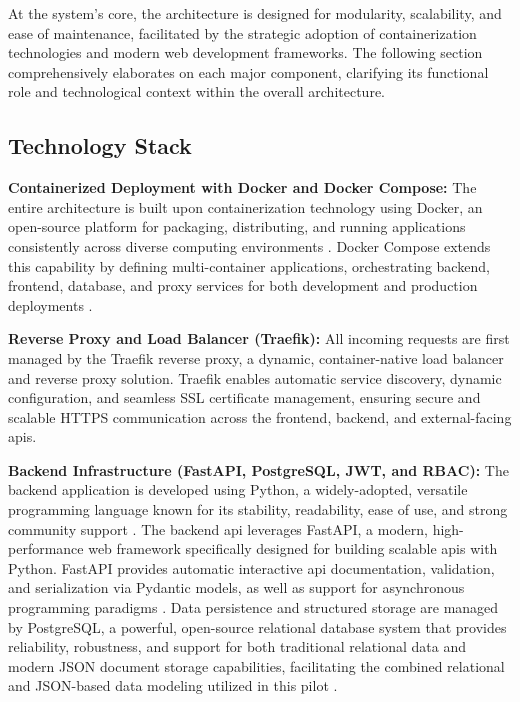 At the system’s core, the architecture is designed for modularity, scalability, and ease of maintenance, facilitated by the strategic adoption of containerization technologies and modern web development frameworks. The following section comprehensively elaborates on each major component, clarifying its functional role and technological context within the overall architecture.

\subsection{Technology Stack}

\textbf{Containerized Deployment with Docker and Docker Compose:}
The entire architecture is built upon containerization technology using Docker, an open-source platform for packaging, distributing, and running applications consistently across diverse computing environments \autocite{DockerInc..n.d.}. Docker Compose extends this capability by defining multi-container applications, orchestrating backend, frontend, database, and proxy services for both development and production deployments \autocite{DockerInc..n.d.b}.

\textbf{Reverse Proxy and Load Balancer (Traefik):}
All incoming requests are first managed by the Traefik reverse proxy, a dynamic, container-native load balancer and reverse proxy solution. Traefik enables automatic service discovery, dynamic configuration, and seamless SSL certificate management, ensuring secure and scalable HTTPS communication across the frontend, backend, and external-facing \ac{api}s. \autocite{TraefikLabs.n.d.}

\textbf{Backend Infrastructure (FastAPI, PostgreSQL, JWT, and RBAC):}
The backend application is developed using Python, a widely-adopted, versatile programming language known for its stability, readability, ease of use, and strong community support \autocite{PythonSoftwareFoundation.n.d.}. The backend \ac{api} leverages FastAPI, a modern, high-performance web framework specifically designed for building scalable \ac{api}s with Python. FastAPI provides automatic interactive \ac{api} documentation, validation, and serialization via Pydantic models, as well as support for asynchronous programming paradigms \autocite{Ramirez.n.d.}. Data persistence and structured storage are managed by PostgreSQL, a powerful, open-source relational database system that provides reliability, robustness, and support for both traditional relational data and modern JSON document storage capabilities, facilitating the combined relational and JSON-based data modeling utilized in this pilot \autocite{ThePostgreSQLGlobalDevelopmentGroup.n.d.}.

